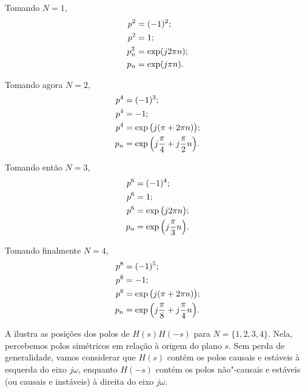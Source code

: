 Tomando $N=1$,
\begin{align}
	p^2&=(-1)^{2};\notag\\
	p^2&=1;\notag\\
	p_n^2&=\exp(j2\pi n);\\
	p_n&=\exp(j\pi n).
\end{align}

Tomando agora $N=2$,
\begin{align}
	p^4&=(-1)^{3};\notag\\
	p^4&=-1;\notag\\
	p^4&=\exp\big(j(\pi+2\pi n)\big);\notag\\
	p_n&=\exp\Big(j\frac{\pi}{4}+j\frac{\pi}{2}n\Big).
\end{align}

Tomando então $N=3$,
\begin{align}
	p^6&=(-1)^{4};\notag\\
	p^6&=1;\notag\\
	p^6&=\exp\big(j2\pi n\big);\notag\\
	p_n&=\exp\Big(j\frac{\pi}{3}n\Big).
\end{align}

Tomando finalmente $N=4$,
\begin{align}
	p^8&=(-1)^{5};\notag\\
	p^8&=-1;\notag\\
	p^8&=\exp\big(j(\pi+2\pi n)\big);\notag\\
	p_n&=\exp\Big(j\frac{\pi}{8}+j\frac{\pi}{4}n\Big).
\end{align}

A  ilustra as posições dos polos de $H(s)H(-s)$ para $N=\{1,2,3,4\}$. Nela, percebemos polos simétricos em relação à origem do plano $s$. Sem perda de generalidade, vamos considerar que $H(s)$ contém os polos causais e estáveis à esquerda do eixo $j\omega$, enquanto $H(-s)$ contém os polos não"-causais e estáveis (ou causais e instáveis) à direita do eixo $j\omega$.

